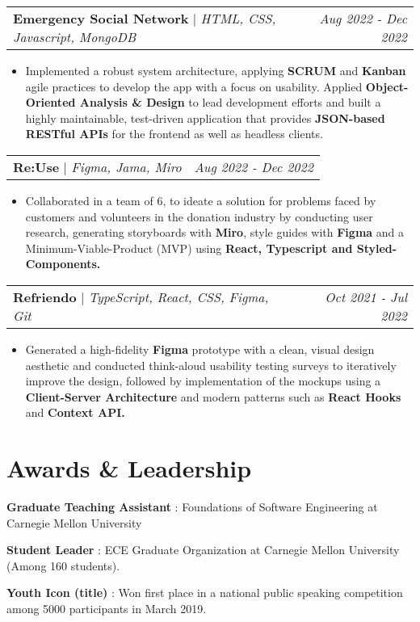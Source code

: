 \documentclass[letterpaper]{article}
\makeatletter
\newcommand{\resumeItemWithoutTitle}[1]{
  \item\small{
    {#1 \vspace{-2pt}}
  }
}
\newcommand{\shortSection}[1]{
    \vspace{-6pt}
    \section{#1}
}
\newcommand{\projectHeading}[3]{
  \begin{tabular*}{\textwidth}{l@{\extracolsep{\fill}}r}
        \textbf{#1} 
        \hspace{-2pt} $\vert$ \hspace{-2pt} \small{\textit{#2}} 
        & 
        \textit{#3} \\
    \end{tabular*}\vspace{-2pt}
}
\newcommand*{\skill}[2]{
  \textbf{#1} : #2 \\
  \vspace{1pt}
}
\newcommand{\resumeItemListStart}{\begin{itemize}}
\newcommand{\resumeItemListEnd}{\end{itemize}}
\makeatother
\begin{document}
\vspace{3pt}
\projectHeading {Emergency Social Network}{HTML, CSS, Javascript, MongoDB}{Aug 2022 - Dec 2022}
\resumeItemListStart
\resumeItemWithoutTitle{Implemented a robust system architecture, applying \textbf{SCRUM} and \textbf{Kanban} agile practices to develop the app with a focus on usability. Applied \textbf{Object-Oriented Analysis \& Design} to lead development efforts and built a highly maintainable, test-driven application that provides \textbf{JSON-based RESTful APIs} for the frontend as well as headless clients.}
\resumeItemListEnd

\vspace{3pt}
\projectHeading {Re:Use}{Figma, Jama, Miro}{Aug 2022 - Dec 2022}
\resumeItemListStart
\resumeItemWithoutTitle{Collaborated in a team of 6, to ideate a solution for problems faced by customers and volunteers in the donation industry by conducting user research, generating storyboards with \textbf{Miro}, style guides with \textbf{Figma} and a Minimum-Viable-Product (MVP) using \textbf{React, Typescript and Styled-Components.}}
\resumeItemListEnd

\vspace{3pt}
\projectHeading {Refriendo}{TypeScript, React, CSS, Figma, Git}{Oct 2021 - Jul 2022}
\resumeItemListStart
\resumeItemWithoutTitle{Generated a high-fidelity \textbf{Figma} prototype with a clean, visual design aesthetic and conducted think-aloud usability testing surveys to iteratively improve the design, followed by implementation of the mockups using a \textbf{Client-Server Architecture} and modern patterns such as \textbf{React Hooks} and \textbf{Context API.}}
\resumeItemListEnd

\shortSection{Awards \& Leadership}
\skill {Graduate Teaching Assistant}{Foundations of Software Engineering at Carnegie Mellon University}
\skill {Student Leader}{ ECE Graduate Organization at Carnegie Mellon University (Among 160 students).}
\skill {Youth Icon (title)}{Won first place in a national public speaking competition among 5000 participants in March 2019.}
\end{document}
